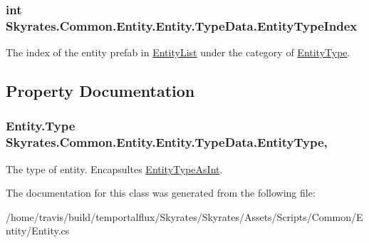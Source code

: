 \hypertarget{class_skyrates_1_1_common_1_1_entity_1_1_entity_1_1_type_data_a11701833c616d61f48c61a0a6d5925a7}{
\subsubsection[{Entity\-Type\-Index}]{\setlength{\rightskip}{0pt plus 5cm}int Skyrates.\-Common.\-Entity.\-Entity.\-Type\-Data.\-Entity\-Type\-Index}}\label{class_skyrates_1_1_common_1_1_entity_1_1_entity_1_1_type_data_a11701833c616d61f48c61a0a6d5925a7}


The index of the entity prefab in \hyperlink{class_skyrates_1_1_common_1_1_entity_1_1_entity_list}{Entity\-List} under the category of \hyperlink{class_skyrates_1_1_common_1_1_entity_1_1_entity_1_1_type_data_a77a694c041e70f02ca1bcc12b9244de5}{Entity\-Type}. 



\subsection{Property Documentation}
\hypertarget{class_skyrates_1_1_common_1_1_entity_1_1_entity_1_1_type_data_a77a694c041e70f02ca1bcc12b9244de5}{
\subsubsection[{Entity\-Type}]{\setlength{\rightskip}{0pt plus 5cm}Entity.\-Type Skyrates.\-Common.\-Entity.\-Entity.\-Type\-Data.\-Entity\-Type\hspace{0.3cm}{\ttfamily [get]}, {\ttfamily [set]}}}\label{class_skyrates_1_1_common_1_1_entity_1_1_entity_1_1_type_data_a77a694c041e70f02ca1bcc12b9244de5}


The type of entity. Encapsultes \hyperlink{class_skyrates_1_1_common_1_1_entity_1_1_entity_1_1_type_data_ae1d503ba32f705ea1c76887377b9ca41}{Entity\-Type\-As\-Int}. 



The documentation for this class was generated from the following file\-:\begin{DoxyCompactItemize}
\item 
/home/travis/build/temportalflux/\-Skyrates/\-Skyrates/\-Assets/\-Scripts/\-Common/\-Entity/Entity.\-cs\end{DoxyCompactItemize}

